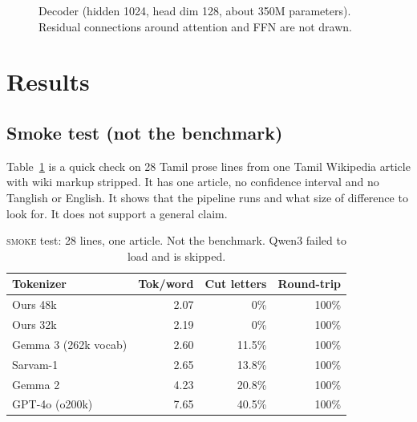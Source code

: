 \documentclass[11pt]{article}
\newcommand{\smoke}{\textsc{smoke}}
\begin{document}
\begin{figure}[t]
\centering
{}
\caption{Decoder (hidden 1024, head dim 128, about 350M parameters). Residual connections around attention and FFN are not drawn.}
\label{fig:arch}
\end{figure}

\section{Results}

\subsection{Smoke test (not the benchmark)}
Table~\ref{tab:smoke} is a quick check on 28 Tamil prose lines from one Tamil Wikipedia article with wiki markup stripped.
It has one article, no confidence interval and no Tanglish or English.
It shows that the pipeline runs and what size of difference to look for.
It does not support a general claim.

\begin{table}[t]
\centering
\small
\begin{tabular}{lrrr}
\toprule
Tokenizer & Tok/word & Cut letters & Round-trip \\
\midrule
Ours 48k & 2.07 & 0\% & 100\% \\
Ours 32k & 2.19 & 0\% & 100\% \\
Gemma 3 (262k vocab) & 2.60 & 11.5\% & 100\% \\
Sarvam-1 & 2.65 & 13.8\% & 100\% \\
Gemma 2 & 4.23 & 20.8\% & 100\% \\
GPT-4o (o200k) & 7.65 & 40.5\% & 100\% \\
\bottomrule
\end{tabular}
\caption{\smoke{} test: 28 lines, one article. Not the benchmark. Qwen3 failed to load and is skipped.}
\label{tab:smoke}
\end{table}
\end{document}
